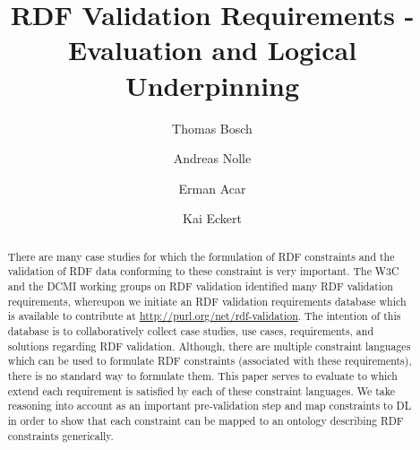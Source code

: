 \documentclass{llncs}
\begin{document}
%
%
\title{RDF Validation Requirements - Evaluation and Logical Underpinning}
\subtitle{}
%
%
\author{Thomas Bosch \and Andreas Nolle \and Erman Acar \and Kai Eckert }
%
%

\maketitle              %

\begin{abstract}
There are many case studies for which the formulation of RDF constraints and the validation of RDF data conforming to these constraint is very important.  
The W3C and the DCMI working groups on RDF validation identified many RDF validation requirements,
whereupon we initiate an RDF validation requirements database which is available to contribute at \url{http://purl.org/net/rdf-validation}.
The intention of this database is to collaboratively collect case studies, use cases, requirements, and solutions regarding RDF validation.
Although, there are multiple constraint languages which can be used to formulate RDF constraints (associated with these requirements), 
there is no standard way to formulate them.
This paper serves to evaluate to which extend each requirement is satisfied by each of these constraint languages.
We take reasoning into account as an important pre-validation step and map constraints to DL
in order to show that each constraint can be mapped to an ontology describing RDF constraints generically.

\end{abstract}
%
\end{document}
